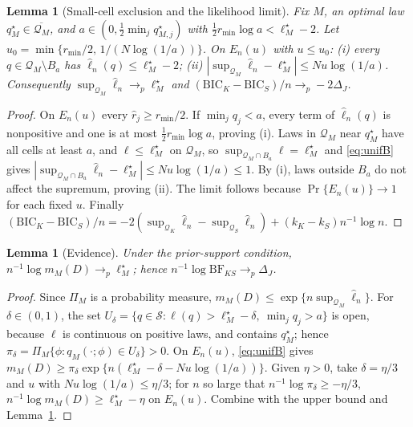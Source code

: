 \documentclass[11pt,letterpaper]{article}
\theoremstyle{plain}
\newtheorem{lemma}[theorem]{Lemma}
\theoremstyle{definition}
\begin{document}
\begin{lemma}[Small-cell exclusion and the likelihood limit]\label{lem:smallcell}
Fix $M$, an optimal law $q^\star_M\in\overline{\mathcal Q_M}$, and $a\in(0,\tfrac12\min_jq^\star_{M,j})$ with $\tfrac12r_{\min}\log a<\ell_M^\star-2$. Let $u_0=\min\{r_{\min}/2,\,1/(N\log(1/a))\}$. On $E_n(u)$ with $u\le u_0$:
(i) every $q\in\mathcal Q_M\setminus B_a$ has $\hat\ell_n(q)\le\ell_M^\star-2$;
(ii) $|\sup_{\mathcal Q_M}\hat\ell_n-\ell_M^\star|\le Nu\log(1/a)$.
Consequently $\sup_{\mathcal Q_M}\hat\ell_n\to_p\ell_M^\star$ and $(\mathrm{BIC}_K-\mathrm{BIC}_S)/n\to_p-2\Delta_J$.
\end{lemma}
\begin{proof}
On $E_n(u)$ every $\hat r_j\ge r_{\min}/2$. If $\min_jq_j<a$, every term of $\hat\ell_n(q)$ is nonpositive and one is at most $\tfrac12r_{\min}\log a$, proving (i). Laws in $\mathcal Q_M$ near $q^\star_M$ have all cells at least $a$, and $\ell\le\ell_M^\star$ on $\mathcal Q_M$, so $\sup_{\mathcal Q_M\cap B_a}\ell=\ell_M^\star$ and \eqref{eq:unifB} gives $|\sup_{\mathcal Q_M\cap B_a}\hat\ell_n-\ell_M^\star|\le Nu\log(1/a)\le1$. By (i), laws outside $B_a$ do not affect the supremum, proving (ii). The limit follows because $\Pr\{E_n(u)\}\to1$ for each fixed $u$. Finally $(\mathrm{BIC}_K-\mathrm{BIC}_S)/n=-2(\sup_{\mathcal Q_K}\hat\ell_n-\sup_{\mathcal Q_S}\hat\ell_n)+(k_K-k_S)n^{-1}\log n$.
\end{proof}

\begin{lemma}[Evidence]\label{lem:evidence}
Under the prior-support condition, $n^{-1}\log m_M(D)\to_p\ell_M^\star$; hence $n^{-1}\log\mathrm{BF}_{KS}\to_p\Delta_J$.
\end{lemma}
\begin{proof}
Since $\Pi_M$ is a probability measure, $m_M(D)\le\exp\{n\sup_{\mathcal Q_M}\hat\ell_n\}$. For $\delta\in(0,1)$, the set $U_\delta=\{q\in\mathcal S:\ell(q)>\ell_M^\star-\delta,\ \min_jq_j>a\}$ is open, because $\ell$ is continuous on positive laws, and contains $q^\star_M$; hence $\pi_\delta=\Pi_M\{\phi:q_M(\cdot;\phi)\in U_\delta\}>0$. On $E_n(u)$, \eqref{eq:unifB} gives $m_M(D)\ge\pi_\delta\exp\{n(\ell_M^\star-\delta-Nu\log(1/a))\}$. Given $\eta>0$, take $\delta=\eta/3$ and $u$ with $Nu\log(1/a)\le\eta/3$; for $n$ so large that $n^{-1}\log\pi_\delta\ge-\eta/3$, $n^{-1}\log m_M(D)\ge\ell_M^\star-\eta$ on $E_n(u)$. Combine with the upper bound and Lemma~\ref{lem:smallcell}.
\end{proof}
\end{document}
